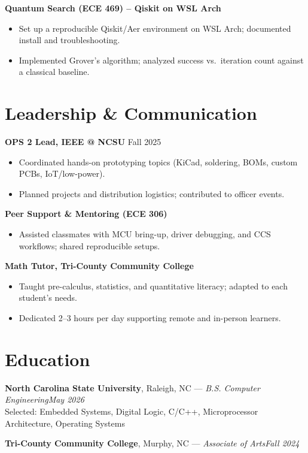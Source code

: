\documentclass[10pt,letterpaper]{article}
\begin{document}
\textbf{Quantum Search (ECE 469) -- Qiskit on WSL Arch}
\begin{itemize}
  \item Set up a reproducible Qiskit/Aer environment on WSL Arch; documented install and troubleshooting.
  \item Implemented Grover’s algorithm; analyzed success vs.\ iteration count against a classical baseline.
\end{itemize}

\section*{Leadership \& Communication}
\textbf{OPS 2 Lead, IEEE @ NCSU} \hfill Fall 2025
\begin{itemize}
  \item Coordinated hands-on prototyping topics (KiCad, soldering, BOMs, custom PCBs, IoT/low-power).
  \item Planned projects and distribution logistics; contributed to officer events.
\end{itemize}

\textbf{Peer Support \& Mentoring (ECE 306)}
\begin{itemize}
  \item Assisted classmates with MCU bring-up, driver debugging, and CCS workflows; shared reproducible setups.
\end{itemize}

\textbf{Math Tutor, Tri-County Community College}
\begin{itemize}
  \item Taught pre-calculus, statistics, and quantitative literacy; adapted to each student’s needs.
  \item Dedicated 2–3 hours per day supporting remote and in-person learners.
\end{itemize}

\section*{Education}
\noindent\textbf{North Carolina State University}, Raleigh, NC — \textit{B.S. Computer Engineering}\hfill \textit{May 2026}\\
{\small Selected: Embedded Systems, Digital Logic, C/C++, Microprocessor Architecture, Operating Systems}

\vspace{2pt}
\noindent\textbf{Tri-County Community College}, Murphy, NC — \textit{Associate of Arts}\hfill \textit{Fall 2024}
\end{document}
